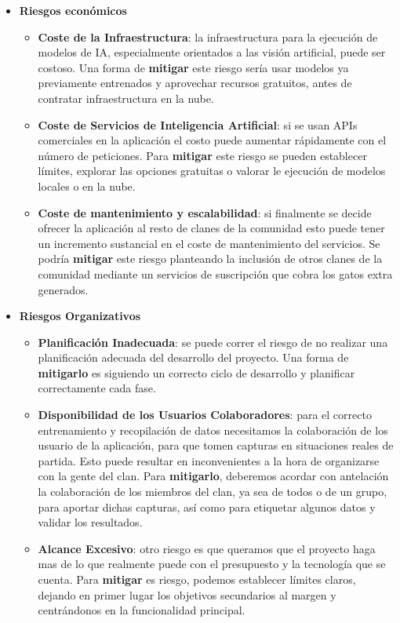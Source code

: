 \begin{itemize}
	\item \textbf{Riesgos económicos}
	\begin{itemize}
		\item \textbf{Coste de la Infraestructura}: la infraestructura para la ejecución de modelos de IA, especialmente orientados a las visión artificial, puede ser costoso. Una forma de \textbf{mitigar} este riesgo sería usar modelos ya previamente entrenados y aprovechar recursos gratuitos, antes de contratar infraestructura en la nube.
		\item \textbf{Coste de Servicios de Inteligencia Artificial}: si se usan APIs comerciales en la aplicación el costo puede aumentar rápidamente con el número de peticiones. Para \textbf{mitigar} este riesgo se pueden establecer límites, explorar las opciones gratuitas o valorar le ejecución de modelos locales o en la nube.
		\item \textbf{Coste de mantenimiento y escalabilidad}: si finalmente se decide ofrecer la aplicación al resto de clanes de la comunidad esto puede tener un incremento sustancial en el coste de mantenimiento del servicios. Se podría \textbf{mitigar} este riesgo planteando la inclusión de otros clanes de la comunidad mediante un servicios de suscripción que cobra los gatos extra generados.
	\end{itemize}
	
	\item \textbf{Riesgos Organizativos}
	\begin{itemize}
		\item \textbf{Planificación Inadecuada}: se puede correr el riesgo de no realizar una planificación adecuada del desarrollo del proyecto. Una forma de \textbf{mitigarlo} es siguiendo un correcto ciclo de desarrollo y planificar correctamente cada fase.
		\item \textbf{Disponibilidad de los Usuarios Colaboradores}: para el correcto entrenamiento y recopilación de datos necesitamos la colaboración de los usuario de la aplicación, para que tomen capturas en situaciones reales de partida. Esto puede resultar en inconvenientes a la hora de organizarse con la gente del clan. Para \textbf{mitigarlo}, deberemos acordar con antelación la colaboración de los miembros del clan, ya sea de todos o de un grupo, para aportar dichas capturas, así como para etiquetar algunos datos y validar los resultados.
		\item \textbf{Alcance Excesivo}: otro riesgo es que queramos que el proyecto haga mas de lo que realmente puede con el presupuesto y la tecnología que se cuenta. Para \textbf{mitigar} es riesgo, podemos establecer límites claros, dejando en primer lugar los objetivos secundarios al margen y centrándonos en la funcionalidad principal.
	\end{itemize}
	

\end{itemize}
